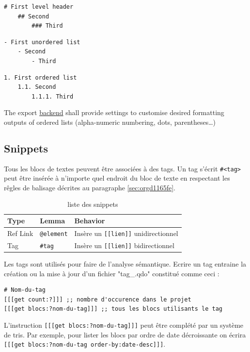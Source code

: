 \documentclass[a4paper,12pt]{article}
\begin{document}
\begin{multicols}{3}
\begin{verbatim}
# First level header
    ## Second    
        ### Third
\end{verbatim}

\begin{verbatim}
- First unordered list
    - Second
        - Third
\end{verbatim}

\begin{verbatim}
1. First ordered list
    1.1. Second
        1.1.1. Third
\end{verbatim}
\end{multicols}

The export \protect\hyperlink{gls-2}{\label{gls-2-use-1}backend} shall provide settings to customise desired formatting outputs of ordered lists (alpha-numeric numbering, dots, parentheses\ldots{}) 
\subsection{Snippets}
\label{sec:org971a147}
Tous les blocs de textes peuvent être associées à des tags.
Un tag s'écrit \texttt{\#<tag>} peut être insérée à n'importe quel endroit du bloc de texte en respectant les rêgles de balisage décrites au paragraphe \ref{sec:orgd1165fe}.

\begin{table}[htbp]
\caption{liste des snippets}
\centering
\begin{tabular}{lll}
\hline
Type & Lemma & Behavior\\
\hline
Ref Link & \texttt{@element} & Insère un \texttt{[[lien]]} unidirectionnel\\
Tag & \texttt{\#tag} & Insère un \texttt{[[lien]]} bidirectionnel\\
\hline
\end{tabular}
\end{table}

Les tags sont utilisés pour faire de l'analyse sémantique. Ecrire un tag entraine la création ou la mise à jour d'un fichier "tag\_<nom-du-tag>.qdo" constitué comme ceci :
\begin{verbatim}
# Nom-du-tag
[[[get count:?]]] ;; nombre d'occurence dans le projet
[[[get blocs:?nom-du-tag]]] ;; tous les blocs utilisants le tag
\end{verbatim}

L'instruction \texttt{[[[get blocs:?nom-du-tag]]]} peut être complété par un système de tris. Par exemple, pour lister les blocs par ordre de date décroissante on écrira \texttt{[[[get blocs:?nom-du-tag order-by:date-desc]]]}.
\end{document}
